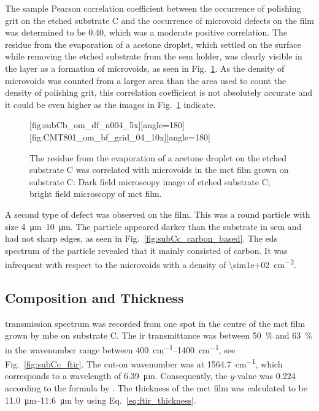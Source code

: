 The sample Pearson correlation coefficient between the occurrence of polishing grit on the etched substrate C and the occurrence of microvoid defects on the film was determined to be \SI{0.40}{}, which was a moderate positive correlation. The residue from the evaporation of a acetone droplet, which settled on the surface while removing the etched substrate from the \ac{sem} holder, was clearly visible in the layer as a formation of microvoids, as seen in Fig.~\ref{fig:subCc_microvoids_correlation}. As the density of microvoids was counted from a larger area than the area used to count the density of polishing grit, this correlation coefficient is not absolutely accurate and it could be even higher as the images in Fig.~\ref{fig:subCc_microvoids_correlation} indicate.

\begin{figure}[htbp]
    \centering
    [fig:subCb_om_df_n004_5x][angle=180]
    \hfill
    [fig:CMT801_om_bf_grid_04_10x][angle=180]
    \caption[Residue on etched substrate C visible as microvoids in the film.]{The residue from the evaporation of a acetone droplet on the etched substrate C was correlated with microvoids in the \ac{mct} film grown on substrate C:  Dark field microscopy image of etched substrate C;  bright field microscopy of \ac{mct} film.}\label{fig:subCc_microvoids_correlation}
\end{figure}

A second type of defect was observed on the film. This was a round particle with size \SIrange{4}{10}{\micro\metre}. The particle appeared darker than the substrate in \ac{sem} and had not sharp edges, as seen in Fig.~\ref{fig:subCc_carbon_based}. The \ac{eds} spectrum of the particle revealed that it mainly consisted of carbon. It was infrequent with respect to the microvoids with a density of \SI{\sim1e+02}{\centi\metre^{-2}}.

\subsection{Composition and Thickness}

 transmission spectrum was recorded from one spot in the centre of the \ac{mct} film grown by \ac{mbe} on substrate C. The \ac{ir} transmittance was between \SI{50}{\percent} and \SI{63}{\percent} in the wavenumber range between \SIrange{400}{1400}{\centi\metre^{-1}}, see Fig.~\ref{fig:subCc_ftir}. The cut-on wavenumber was at \SI{1564.7}{\centi\metre^{-1}}, which corresponds to a wavelength of \SI{6.39}{\micro\metre}. Consequently, the $y$-value was \SI{0.224}{} according to the formula by \citet{bricexxxxtttt}. The thickness of the \ac{mct} film was calculated to be \SIrange{11.0}{11.6}{\micro\metre} by using Eq.~\ref{eq:ftir_thickness}.

